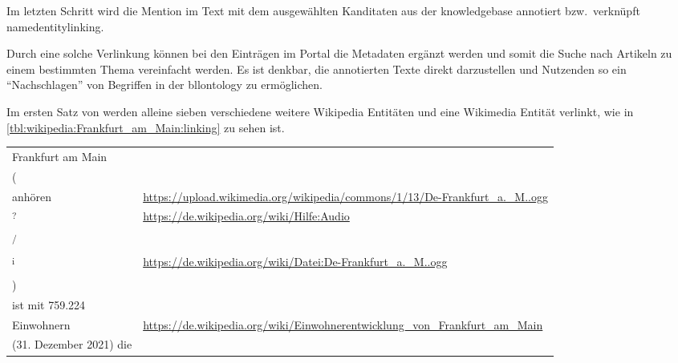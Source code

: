 Im letzten Schritt wird die Mention im Text mit dem ausgewählten Kanditaten aus der \gls{knowledgebase}
annotiert bzw.\, verknüpft \gls{namedentitylinking}.

Durch eine solche Verlinkung
können bei den Einträgen im Portal die Metadaten ergänzt werden
und somit die Suche nach Artikeln zu einem bestimmten Thema vereinfacht werden.
Es ist denkbar,
die annotierten Texte direkt darzustellen
und Nutzenden so ein \enquote{Nachschlagen}
von Begriffen in der \gls{bllontology} zu ermöglichen.

Im ersten Satz von  werden alleine sieben verschiedene weitere Wikipedia Entitäten und eine Wikimedia Entität verlinkt,
wie in \cref{tbl:wikipedia:Frankfurt_am_Main:linking} zu sehen ist.

\begin{table}
	\begin{adjustbox}{max width=0.8\linewidth,}
		\begin{tabularx}{\textwidth}{l l}
			Frankfurt am Main          &                                                                                               \\
			(                          &                                                                                               \\
			anhören                    & {\url{https://upload.wikimedia.org/wikipedia/commons/1/13/De-Frankfurt_a._M..ogg}}            \\
			\textsuperscript{?}        & {\url{https://de.wikipedia.org/wiki/Hilfe:Audio}}                                             \\
			\textsuperscript{/}        &                                                                                               \\
			\textsuperscript{i}        & {\url{https://de.wikipedia.org/wiki/Datei:De-Frankfurt_a._M..ogg}}                            \\
			)                          &                                                                                               \\
			ist mit 759.224            &                                                                                               \\
			Einwohnern                 & {\url{https://de.wikipedia.org/wiki/Einwohnerentwicklung_von_Frankfurt_am_Main}}              \\
			(31. Dezember 2021) die    &                                                                                               \\

\end{tabularx}
\end{adjustbox}
\end{table}
